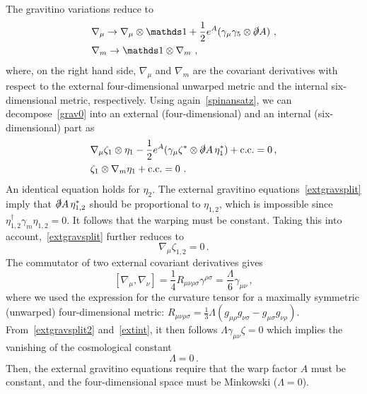 \documentclass[debug]{phd}
\begin{document}
The gravitino variations reduce to 
\begin{align}
& \nabla_\mu \rightarrow \nabla_\mu\otimes \id 
+ \frac{1}{2}e^A (\gamma_\mu \gamma_5 \otimes \slashed\partial A )\ , \\
& \nabla_m \rightarrow \id\otimes \nabla_m\ ,
\end{align}
where, on the right hand side, $\nabla_\mu$ and $\nabla_m$ are the covariant derivatives with respect to the external four-dimensional unwarped metric and the internal six-dimensional metric, respectively. Using again~\eqref{spinansatz}, we can decompose~\eqref{grav0} into
an external (four-dimensional) and an internal (six-dimensional) part as
\begin{align}
\label{extgravsplit} 
& \nabla_\mu\zeta_1 \otimes \eta_1 - \frac{1}{2}e^A (\gamma_\mu \zeta^* \otimes \slashed\partial A\, \eta_1^*)+\text{c.c.}=0 \, , \\
\label{intgravsplit}
& \zeta_1 \otimes \nabla_m \eta_1+\text{c.c.}=0 \ .
\end{align}
An identical equation holds for $\eta_2$.
The external gravitino equations~\eqref{extgravsplit} imply that $\slashed\partial A\, \eta_{1,2}^*$ should be proportional to $\eta_{1,2}$, which is impossible since $\eta_{1,2}^\dagger\gamma_m\eta_{1,2}=0$. It follows that the warping must be constant. Taking this into account,~\eqref{extgravsplit} further reduces to
\begin{equation}
\label{extgravsplit2}
\nabla_\mu\zeta_{1,2}=0 \, .
\end{equation}
The commutator of two external covariant derivatives gives
 \begin{equation}\label{extint}
[\nabla_\mu, \nabla_\nu]= \frac{1}{4\!} R_{\mu \nu \rho \sigma} \gamma^{\rho \sigma}= \frac{\Lambda}{6} \gamma_{\mu \nu} \, ,
\end{equation}
where we used the expression for the curvature tensor for a maximally symmetric (unwarped) four-dimensional metric:
$R_{\mu \nu \rho \sigma} = \frac{1}{3} \Lambda (g_{\mu \rho} g_{\nu \sigma}
- g_{\mu \sigma} g_{\nu \rho})$. 
From~\eqref{extgravsplit2} and~\eqref{extint}, it then follows $\Lambda\gamma_{\mu \nu}\zeta=0$
which implies the vanishing of the cosmological constant
\begin{equation}
\label{lapl}
\Lambda = 0 \, .
\end{equation}
Then, the external gravitino equations require that the warp factor $A$ must be constant, 
and the four-dimensional space must be Minkowski ($\Lambda =0$).
\end{document}
